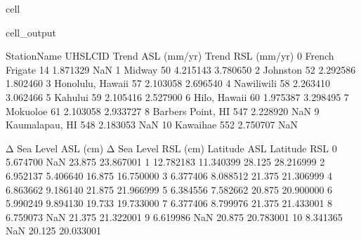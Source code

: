 \documentclass[letterpaper,10pt,english]{jupyterBook}
\begin{document}
\begin{sphinxuseclass}{cell}
\begin{sphinxVerbatimOutput}
\begin{sphinxuseclass}{cell_output}
\begin{sphinxVerbatim}[commandchars=\\\{\}]
         Station\PYGZus{}Name  UHSLC\PYGZus{}ID  Trend ASL (mm/yr)  Trend RSL (mm/yr)  \PYGZbs{}
0      French Frigate        14           1.871329                NaN   
1              Midway        50           4.215143           3.780650   
2            Johnston        52           2.292586           1.802460   
3    Honolulu, Hawaii        57           2.103058           2.696540   
4          Nawiliwili        58           2.263410           3.062466   
5             Kahului        59           2.105416           2.527900   
6        Hilo, Hawaii        60           1.975387           3.298495   
7            Mokuoloe        61           2.103058           2.933727   
8   Barbers Point, HI       547           2.228920                NaN   
9      Kaumalapau, HI       548           2.183053                NaN   
10           Kawaihae       552           2.750707                NaN   

    Δ Sea Level ASL (cm)  Δ Sea Level RSL (cm)  Latitude ASL  Latitude RSL  \PYGZbs{}
0               5.674700                   NaN        23.875     23.867001   
1              12.782183             11.340399        28.125     28.216999   
2               6.952137              5.406640        16.875     16.750000   
3               6.377406              8.088512        21.375     21.306999   
4               6.863662              9.186140        21.875     21.966999   
5               6.384556              7.582662        20.875     20.900000   
6               5.990249              9.894130        19.733     19.733000   
7               6.377406              8.799976        21.375     21.433001   
8               6.759073                   NaN        21.375     21.322001   
9               6.619986                   NaN        20.875     20.783001   
10              8.341365                   NaN        20.125     20.033001   


\end{sphinxVerbatim}
\end{sphinxuseclass}
\end{sphinxVerbatimOutput}
\end{sphinxuseclass}
\end{document}
